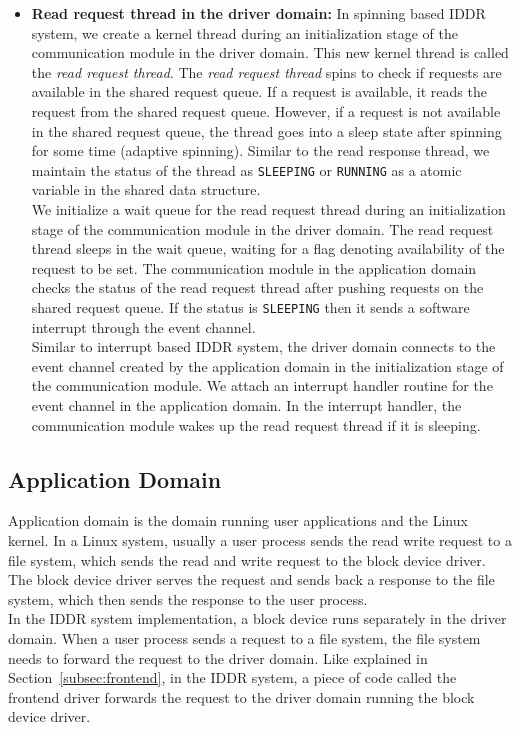 \begin{itemize}
\item \textbf{Read request thread in the driver domain:}
In spinning based IDDR system, we create a kernel thread during an initialization stage of the communication module in the driver domain. This new kernel thread is called the \textit{read request thread}. The \textit{read request thread} spins to check if requests are available in the shared request queue. If a request is available, it reads the request from the shared request queue. However, if a request is not available in the shared request queue, the thread goes into a sleep state after spinning for some time (adaptive spinning). Similar to the read response thread, we maintain the status of the thread as \texttt{SLEEPING} or \texttt{RUNNING} as a atomic variable in the shared data structure. 
\\[3mm]
We initialize a wait queue for the read request thread during an initialization stage of the communication module in the driver domain. The read request thread sleeps in the wait queue, waiting for a flag denoting availability of the request to be set. The communication module in the application domain checks the status of the read request thread after pushing requests on the shared request queue. If the status is \texttt{SLEEPING} then it sends a software interrupt through the event channel.
\\[3mm]
Similar to interrupt based IDDR system, the driver domain connects to the event channel created by the application domain in the initialization stage of the communication module. We attach an interrupt handler routine for the event channel in the application domain. In the interrupt handler, the communication module wakes up the read request thread if it is sleeping. 
\end{itemize}

\subsection{Application Domain}

Application domain is the domain running user applications and the Linux kernel. In a Linux system, usually a user process sends the read write request to a file system, which sends the read and write request to the block device driver. The block device driver serves the request and sends back a response to the file system, which then sends the response to the user process. 
\\[3mm]
In the IDDR system implementation, a block device runs separately in the driver domain. When a user process sends a request to a file system, the file system needs to forward the request to the driver domain. Like explained in Section~\ref{subsec:frontend}, in the IDDR system, a piece of code called the frontend driver forwards the request to the driver domain running the block device driver. 

